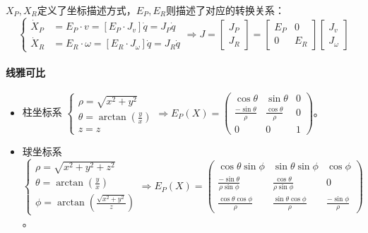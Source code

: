 \documentclass[
12pt, %
a4paper, 
oneside, %
headinclude,footinclude, %
]{scrartcl}
\begin{document}
$ X_P, X_R $定义了坐标描述方式，$ E_P, E_R $则描述了对应的转换关系：
$$
\begin{cases} \dot{X}_P &= E_P \cdot v = [E_P \cdot J_v] \dot{q} = J_P \dot{q} \\ \dot{X}_R &= E_R \cdot \omega = [E_R \cdot J_\omega] \dot{q} = J_R \dot{q} \end{cases}
\Longrightarrow
J = \begin{bmatrix} J_P \\ J_R \end{bmatrix} = \begin{bmatrix} E_P & 0 \\ 0 & E_R \end{bmatrix} \begin{bmatrix} J_v \\ J_\omega \end{bmatrix}
$$
\paragraph{线雅可比}
\begin{itemize}
\item 柱坐标系
$
\begin{cases} \rho = \sqrt{x^2 + y^2} \\ \theta = \arctan(\frac{y}{x}) \\ z = z \end{cases}
\Rightarrow
E_P(X) = \begin{pmatrix} \cos\theta & \sin\theta & 0 \\ \frac{-\sin\theta}{\rho} & \frac{\cos\theta}{\rho} & 0 \\ 0 & 0 & 1 \end{pmatrix}
$。
\item 球坐标系
$
\begin{cases} \rho = \sqrt{x^2 + y^2 + z^2} \\ \theta = \arctan(\frac{y}{x}) \\ \phi = \arctan(\frac{\sqrt{x^2 + y^2}}{z}) \end{cases}
\Rightarrow
E_P(X) = \begin{pmatrix} \cos\theta \sin\phi & \sin\theta \sin\phi & \cos\phi \\ \frac{-\sin\theta}{\rho \sin\phi} & \frac{\cos\theta}{\rho \sin\phi} & 0 \\ \frac{\cos\theta \cos\phi}{\rho} & \frac{\sin\theta \cos\phi}{\rho} & \frac{-\sin\phi}{\rho} \end{pmatrix}
$。
\end{itemize} 
\end{document}
